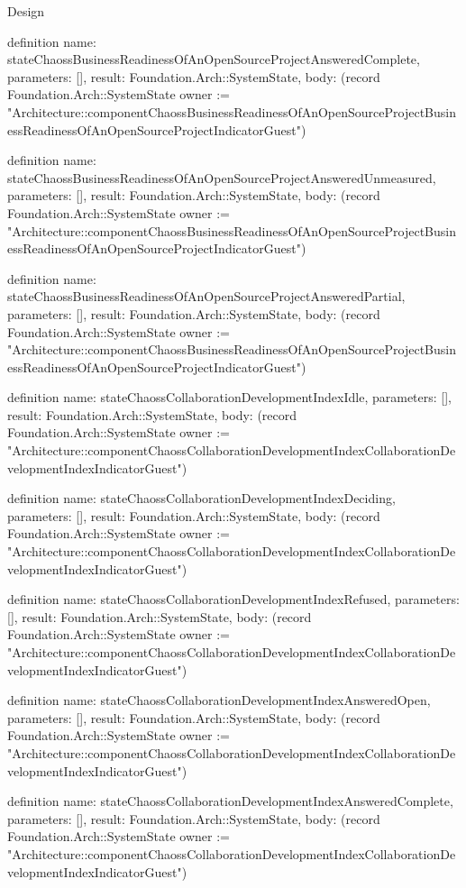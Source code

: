 \begin{lexlean}{Design}
\begin{semanticmodule}
definition{
  name: stateChaossBusinessReadinessOfAnOpenSourceProjectAnsweredComplete,
  parameters: [],
  result: Foundation.Arch::SystemState,
  body: (record Foundation.Arch::SystemState {owner := "Architecture::componentChaossBusinessReadinessOfAnOpenSourceProjectBusinessReadinessOfAnOpenSourceProjectIndicatorGuest"})
}

definition{
  name: stateChaossBusinessReadinessOfAnOpenSourceProjectAnsweredUnmeasured,
  parameters: [],
  result: Foundation.Arch::SystemState,
  body: (record Foundation.Arch::SystemState {owner := "Architecture::componentChaossBusinessReadinessOfAnOpenSourceProjectBusinessReadinessOfAnOpenSourceProjectIndicatorGuest"})
}

definition{
  name: stateChaossBusinessReadinessOfAnOpenSourceProjectAnsweredPartial,
  parameters: [],
  result: Foundation.Arch::SystemState,
  body: (record Foundation.Arch::SystemState {owner := "Architecture::componentChaossBusinessReadinessOfAnOpenSourceProjectBusinessReadinessOfAnOpenSourceProjectIndicatorGuest"})
}

definition{
  name: stateChaossCollaborationDevelopmentIndexIdle,
  parameters: [],
  result: Foundation.Arch::SystemState,
  body: (record Foundation.Arch::SystemState {owner := "Architecture::componentChaossCollaborationDevelopmentIndexCollaborationDevelopmentIndexIndicatorGuest"})
}

definition{
  name: stateChaossCollaborationDevelopmentIndexDeciding,
  parameters: [],
  result: Foundation.Arch::SystemState,
  body: (record Foundation.Arch::SystemState {owner := "Architecture::componentChaossCollaborationDevelopmentIndexCollaborationDevelopmentIndexIndicatorGuest"})
}

definition{
  name: stateChaossCollaborationDevelopmentIndexRefused,
  parameters: [],
  result: Foundation.Arch::SystemState,
  body: (record Foundation.Arch::SystemState {owner := "Architecture::componentChaossCollaborationDevelopmentIndexCollaborationDevelopmentIndexIndicatorGuest"})
}

definition{
  name: stateChaossCollaborationDevelopmentIndexAnsweredOpen,
  parameters: [],
  result: Foundation.Arch::SystemState,
  body: (record Foundation.Arch::SystemState {owner := "Architecture::componentChaossCollaborationDevelopmentIndexCollaborationDevelopmentIndexIndicatorGuest"})
}

definition{
  name: stateChaossCollaborationDevelopmentIndexAnsweredComplete,
  parameters: [],
  result: Foundation.Arch::SystemState,
  body: (record Foundation.Arch::SystemState {owner := "Architecture::componentChaossCollaborationDevelopmentIndexCollaborationDevelopmentIndexIndicatorGuest"})
}


\end{semanticmodule}
\end{lexlean}
